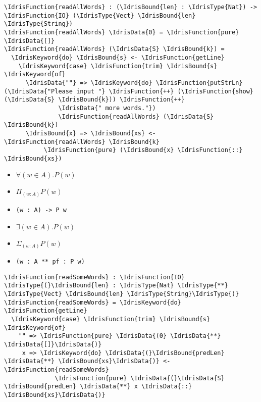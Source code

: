 \documentclass[xetex,xcolor={usenames,dvipsnames},mathserif,serif,17pt]{beamer}
\newcommand{\IdrisData}[1]{\textcolor{red}{#1}}
\newcommand{\IdrisType}[1]{\textcolor{blue}{#1}}
\newcommand{\IdrisBound}[1]{\textcolor{violet}{#1}}
\newcommand{\IdrisFunction}[1]{\textcolor{OliveGreen}{#1}}
\newcommand{\IdrisKeyword}[1]{{\underline{#1}}}
\begin{document}
\begin{frame}[fragile]
\begin{Verbatim}[commandchars=\\\{\}]
\IdrisFunction{readAllWords} : (\IdrisBound{len} : \IdrisType{Nat}) -> \IdrisFunction{IO} (\IdrisType{Vect} \IdrisBound{len} \IdrisType{String})
\IdrisFunction{readAllWords} \IdrisData{0} = \IdrisFunction{pure} \IdrisData{[]}
\IdrisFunction{readAllWords} (\IdrisData{S} \IdrisBound{k}) =
  \IdrisKeyword{do} \IdrisBound{s} <- \IdrisFunction{getLine}
    \IdrisKeyword{case} \IdrisFunction{trim} \IdrisBound{s} \IdrisKeyword{of}
      \IdrisData{""} => \IdrisKeyword{do} \IdrisFunction{putStrLn} (\IdrisData{"Please input "} \IdrisFunction{++} (\IdrisFunction{show} (\IdrisData{S} \IdrisBound{k})) \IdrisFunction{++}
               \IdrisData{" more words."})
               \IdrisFunction{readAllWords} (\IdrisData{S} \IdrisBound{k})
      \IdrisBound{x} => \IdrisBound{xs} <- \IdrisFunction{readAllWords} \IdrisBound{k}
           \IdrisFunction{pure} (\IdrisBound{x} \IdrisFunction{::} \IdrisBound{xs})
\end{Verbatim}
\end{frame}

\fontsize{24}{24}\selectfont

\begin{frame}
  \begin{itemize}
  \item $\forall (w \in A). P(w)$
  \item $\Pi_{(w:A)} P(w)$
  \item \lstinline{(w : A) -> P w}
  \end{itemize}
\end{frame}

\begin{frame}
  \begin{itemize}
  \item $\exists (w \in A). P(w)$
  \item $\Sigma_{(w:A)} P(w)$
  \item \lstinline{(w : A ** pf : P w)}
  \end{itemize}
\end{frame}

\fontsize{11}{11}\selectfont

\begin{frame}[fragile]
\begin{Verbatim}[commandchars=\\\{\}]
\IdrisFunction{readSomeWords} : \IdrisFunction{IO} \IdrisType{(}\IdrisBound{len} : \IdrisType{Nat} \IdrisType{**}  \IdrisType{Vect} \IdrisBound{len} \IdrisType{String}\IdrisType{)}
\IdrisFunction{readSomeWords} = \IdrisKeyword{do} \IdrisFunction{getLine}
  \IdrisKeyword{case} \IdrisFunction{trim} \IdrisBound{s} \IdrisKeyword{of}
    "" => \IdrisFunction{pure} \IdrisData{(0} \IdrisData{**} \IdrisData{[]}\IdrisData{)}
     x => \IdrisKeyword{do} \IdrisData{(}\IdrisBound{predLen} \IdrisData{**} \IdrisBound{xs}\IdrisData{)} <- \IdrisFunction{readSomeWords}
              \IdrisFunction{pure} \IdrisData{(}\IdrisData{S} \IdrisBound{predLen} \IdrisData{**} x \IdrisData{::} \IdrisBound{xs}\IdrisData{)}
\end{Verbatim}
\end{frame}
\end{document}

